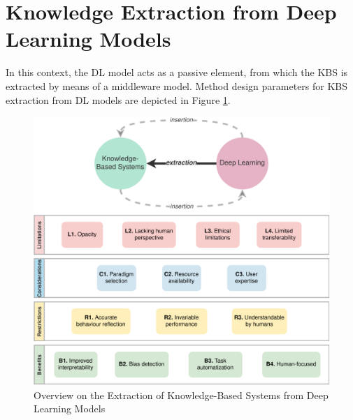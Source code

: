 \section{Knowledge Extraction from Deep Learning Models}\label{6_sec:kbs_extra_dl_method}
In this context, the DL model acts as a passive element, from which the KBS is extracted by means of a middleware model. Method design parameters for KBS extraction from DL models are depicted in Figure \ref{fig:kbs_extra_dl_overview}.
\begin{figure}[t]
    \centering
    \includegraphics[width=\linewidth]{6_kbsextractiondl/figures/K_extraction_DL.eps}
    \caption{Overview on the Extraction of Knowledge-Based Systems from Deep Learning Models}
    \label{fig:kbs_extra_dl_overview}
\end{figure}


